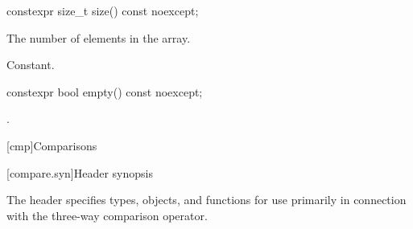 %
\begin{itemdecl}
constexpr size_t size() const noexcept;
\end{itemdecl}

\begin{itemdescr}
\pnum
\returns
The number of elements in the array.

\pnum
\complexity
Constant.
\end{itemdescr}

%
\begin{itemdecl}
constexpr bool empty() const noexcept;
\end{itemdecl}

\begin{itemdescr}
\pnum
\returns
{}.
\end{itemdescr}

[cmp]{Comparisons}

[compare.syn]{Header  synopsis}

\pnum
The header  specifies types, objects, and functions
for use primarily in connection with
the three-way comparison operator.

